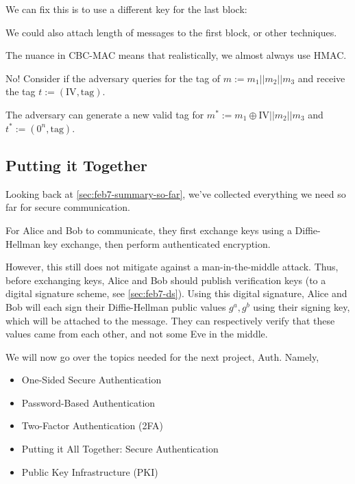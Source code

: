 We can fix this is to use a different key for the last block:


We could also attach length of messages to the first block, or other techniques.

The nuance in CBC-MAC means that realistically, we almost always use HMAC.


No! Consider if the adversary queries for the tag of $m := m_1 || m_2 || m_3$ and receive the tag $t := (\text{IV}, \text{tag})$.

The adversary can generate a new valid tag for $m^* := m_1 \oplus \text{IV} || m_2 || m_3$ and $t^* := (0^n, \text{tag})$.


\subsection{Putting it Together}

Looking back at \cref{sec:feb7-summary-so-far}, we've collected everything we need so far for secure communication.

For Alice and Bob to communicate, they first exchange keys using a Diffie-Hellman key exchange, then perform authenticated encryption.


However, this still does not mitigate against a man-in-the-middle attack. Thus, before exchanging keys, Alice and Bob should publish verification keys (to a digital signature scheme, see \cref{sec:feb7-ds}). Using this digital signature, Alice and Bob will each sign their Diffie-Hellman public values $g^a, g^b$ using their signing key, which will be attached to the message. They can respectively verify that these values came from each other, and not some Eve in the middle.

We will now go over the topics needed for the next project, Auth. Namely,
\begin{itemize}
    \item One-Sided Secure Authentication
    \item Password-Based Authentication
    \item Two-Factor Authentication (2FA)
    \item Putting it All Together: Secure Authentication
    \item Public Key Infrastructure (PKI)
\end{itemize}

